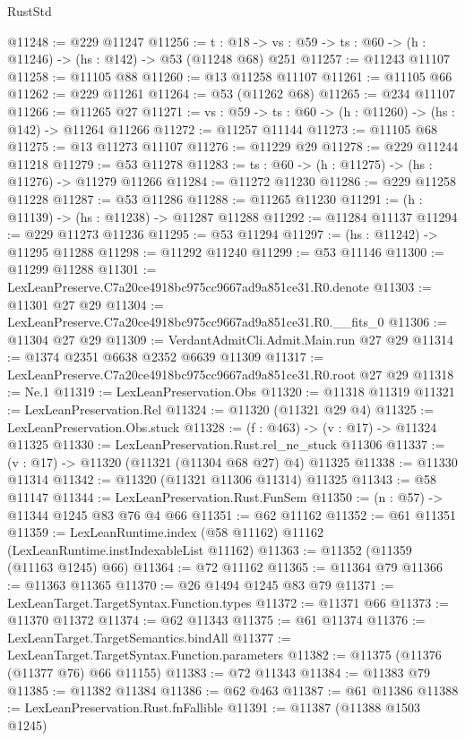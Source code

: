 \begin{lexlean}{RustStd}
\begin{coremodule}
@11248 := @229 @11247
@11256 := {t : @18} ->
  {vs : @59} -> {ts : @60} -> (h : @11246) -> (hs : @142) -> @53 (@11248 @68) @251
@11257 := @11243 @11107
@11258 := @11105 @88
@11260 := @13 @11258 @11107
@11261 := @11105 @66
@11262 := @229 @11261
@11264 := @53 (@11262 @68)
@11265 := @234 @11107
@11266 := @11265 @27
@11271 := {vs : @59} -> {ts : @60} -> (h : @11260) -> (hs : @142) -> @11264 @11266
@11272 := @11257 @11144
@11273 := @11105 @68
@11275 := @13 @11273 @11107
@11276 := @11229 @29
@11278 := @229 @11244 @11218
@11279 := @53 @11278
@11283 := {ts : @60} -> (h : @11275) -> (hs : @11276) -> @11279 @11266
@11284 := @11272 @11230
@11286 := @229 @11258 @11228
@11287 := @53 @11286
@11288 := @11265 @11230
@11291 := (h : @11139) -> (hs : @11238) -> @11287 @11288
@11292 := @11284 @11137
@11294 := @229 @11273 @11236
@11295 := @53 @11294
@11297 := (hs : @11242) -> @11295 @11288
@11298 := @11292 @11240
@11299 := @53 @11146
@11300 := @11299 @11288
@11301 := LexLeanPreserve.C7a20ce4918bc975cc9667ad9a851ce31.R0.denote
@11303 := @11301 @27 @29
@11304 := LexLeanPreserve.C7a20ce4918bc975cc9667ad9a851ce31.R0.__fits_0
@11306 := @11304 @27 @29
@11309 := VerdantAdmitCli.Admit.Main.run @27 @29
@11314 := @1374 @2351 @6638 @2352 @6639 @11309
@11317 := LexLeanPreserve.C7a20ce4918bc975cc9667ad9a851ce31.R0.root @27 @29
@11318 := Ne.{1}
@11319 := LexLeanPreservation.Obs
@11320 := @11318 @11319
@11321 := LexLeanPreservation.Rel
@11324 := @11320 (@11321 @29 @4)
@11325 := LexLeanPreservation.Obs.stuck
@11328 := (f : @463) -> (v : @17) -> @11324 @11325
@11330 := LexLeanPreservation.Rust.rel_ne_stuck @11306
@11337 := (v : @17) -> @11320 (@11321 (@11304 @68 @27) @4) @11325
@11338 := @11330 @11314
@11342 := @11320 (@11321 @11306 @11314) @11325
@11343 := @58 @11147
@11344 := LexLeanPreservation.Rust.FunSem
@11350 := (n : @57) -> @11344 @1245 @83 @76 @4 @66
@11351 := @62 @11162
@11352 := @61 @11351
@11359 := LexLeanRuntime.index (@58 @11162) @11162 (LexLeanRuntime.instIndexableList @11162)
@11363 := @11352 (@11359 (@11163 @1245) @66)
@11364 := @72 @11162
@11365 := @11364 @79
@11366 := @11363 @11365
@11370 := @26 @1494 @1245 @83 @79
@11371 := LexLeanTarget.TargetSyntax.Function.types
@11372 := @11371 @66
@11373 := @11370 @11372
@11374 := @62 @11343
@11375 := @61 @11374
@11376 := LexLeanTarget.TargetSemantics.bindAll
@11377 := LexLeanTarget.TargetSyntax.Function.parameters
@11382 := @11375 (@11376 (@11377 @76) @66 @11155)
@11383 := @72 @11343
@11384 := @11383 @79
@11385 := @11382 @11384
@11386 := @62 @463
@11387 := @61 @11386
@11388 := LexLeanPreservation.Rust.fnFallible
@11391 := @11387 (@11388 @1503 @1245)

\end{coremodule}
\end{lexlean}

